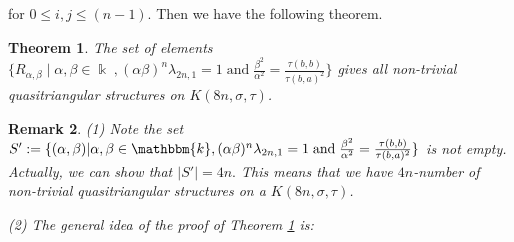 \documentclass[a4paper,11pt]{amsart}
\def \k{\mathbbm{k}}
\numberwithin{equation}{section}
\newtheorem{theorem}{Theorem}[section]
\newtheorem{remark}[theorem]{Remark}
\begin{document}
for $0 \leq i,j \leq (n-1)$. Then we have the following theorem.
\begin{theorem}\label{pro4.2}
The set of elements $\{R_{\alpha,\beta}\;|\;\alpha,\beta \in \Bbbk \;,(\alpha\beta)^n\lambda_{2n,1}=1\; \text{and}\; \frac{\beta^2}{\alpha^2}=\frac{\tau(b,b)}{\tau(b,a)^2}\}$ gives all non-trivial quasitriangular structures on $K(8n,\sigma,\tau)$.
\end{theorem}
\begin{remark} \emph{(1) Note the set $S':=\{(\alpha,\beta)|\alpha, \beta\in \k, (\alpha\beta)^n\lambda_{2n,1}=1\;\text{and}\;  \frac{\beta^2}{\alpha^2}=\frac{\tau(b,b)}{\tau(b,a)^2}\}$ is not empty. Actually, we can show that $|S'|=4n.$ This means that we have $4n$-number of non-trivial quasitriangular structures on a $K(8n,\sigma,\tau)$.}

\emph{(2) The general idea of the proof of Theorem \ref{pro4.2} is: }


\end{remark}
\end{document}
